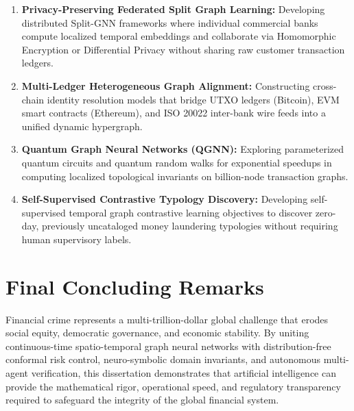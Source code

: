 \begin{enumerate}
    \item \textbf{Privacy-Preserving Federated Split Graph Learning:} Developing distributed Split-GNN frameworks where individual commercial banks compute localized temporal embeddings and collaborate via Homomorphic Encryption or Differential Privacy without sharing raw customer transaction ledgers.
    \item \textbf{Multi-Ledger Heterogeneous Graph Alignment:} Constructing cross-chain identity resolution models that bridge UTXO ledgers (Bitcoin), EVM smart contracts (Ethereum), and ISO 20022 inter-bank wire feeds into a unified dynamic hypergraph.
    \item \textbf{Quantum Graph Neural Networks (QGNN):} Exploring parameterized quantum circuits and quantum random walks for exponential speedups in computing localized topological invariants on billion-node transaction graphs.
    \item \textbf{Self-Supervised Contrastive Typology Discovery:} Developing self-supervised temporal graph contrastive learning objectives to discover zero-day, previously uncataloged money laundering typologies without requiring human supervisory labels.
\end{enumerate}

\section{Final Concluding Remarks}
Financial crime represents a multi-trillion-dollar global challenge that erodes social equity, democratic governance, and economic stability. By uniting continuous-time spatio-temporal graph neural networks with distribution-free conformal risk control, neuro-symbolic domain invariants, and autonomous multi-agent verification, this dissertation demonstrates that artificial intelligence can provide the mathematical rigor, operational speed, and regulatory transparency required to safeguard the integrity of the global financial system.
